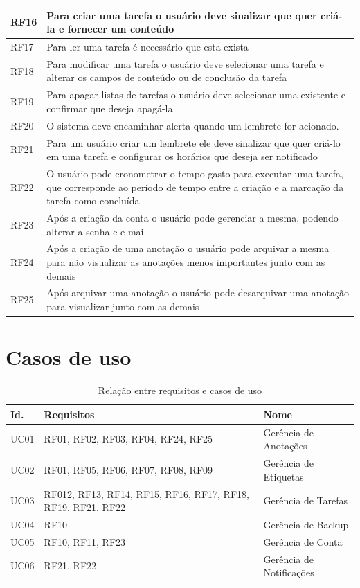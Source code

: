 \documentclass[
	12pt,				%
	oneside,			%
	a4paper,			%
	english,			%
	brazil,				%
	]{abntex2}
\begin{document}
\begin{longtable}{@{}p{}p{}@{}}
RF16 & Para criar uma tarefa o usuário deve sinalizar que quer criá-la e fornecer um conteúdo \\ \midrule
RF17 & Para ler uma tarefa é necessário que esta exista \\ \midrule
RF18 & Para modificar uma tarefa o usuário deve selecionar uma tarefa e alterar os campos de conteúdo ou de conclusão da tarefa \\ \midrule
RF19 & Para apagar listas de tarefas o usuário deve selecionar uma existente e confirmar que deseja apagá-la \\ \midrule
RF20 & O sistema deve encaminhar alerta quando um lembrete for acionado. \\ \midrule
RF21 & Para um usuário criar um lembrete ele deve sinalizar que quer criá-lo em uma tarefa e configurar os horários que deseja ser notificado\\ \midrule
RF22 & O usuário pode cronometrar o tempo gasto para executar uma tarefa, que corresponde ao período de tempo entre a criação  e a marcação da tarefa como concluída \\\midrule
RF23 & Após a criação da conta o usuário pode gerenciar a mesma, podendo alterar a senha e e-mail\\\midrule
RF24 & Após a criação de uma anotação o usuário pode arquivar a mesma para não visualizar as anotações menos importantes junto com as demais\\\midrule 
RF25 & Após arquivar uma anotação o usuário pode desarquivar uma anotação para visualizar junto com as demais\\\bottomrule
 
\end{longtable}

\section{Casos de uso}

\IBGEtabfontsize
\begin{longtable}{@{}lll@{}}
\caption{Relação entre requisitos e casos de uso}
\label{tab:requisitos_x_casos_de_uso} \\
\toprule
\textbf{Id.} & \textbf{Requisitos} & \textbf{Nome} \\ \midrule
UC01 & RF01, RF02, RF03, RF04, RF24, RF25 & Gerência de Anotações\\ \midrule
UC02 & RF01, RF05, RF06, RF07, RF08, RF09 & Gerência de Etiquetas\\ \midrule
UC03 & RF012, RF13, RF14, RF15, RF16, RF17, RF18, RF19, RF21, RF22 & Gerência de Tarefas\\ \midrule
UC04 & RF10 & Gerência de Backup\\ \midrule
UC05 & RF10, RF11, RF23 & Gerência de Conta\\ \midrule
UC06 & RF21, RF22 & Gerência de Notificações\\ \bottomrule
\end{longtable}
\end{document}
